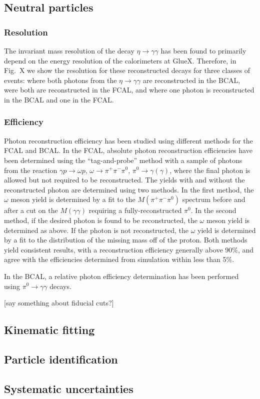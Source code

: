 \subsection{Neutral particles \label{sec:perfneutral}}

\subsubsection{Resolution \label{sec:perfneutralresol}}

The invariant mass resolution of the decay $\eta \to \gamma \gamma$ has been found to primarily depend on the energy resolution of the calorimeters at GlueX.  Therefore, in Fig.~X we show the resolution for these reconstructed decays for three classes of events: where both photons from the  $\eta \to \gamma \gamma$ are reconstructed in the BCAL, were both are reconstructed in the FCAL, and where one photon is reconstructed in the BCAL and one in the FCAL.

\subsubsection{Efficiency \label{sec:perfneutraleff}}

Photon reconstruction efficiency has been studied using different methods for the FCAL and BCAL.  In the FCAL, absolute photon reconstruction efficiencies have been determined using the ``tag-and-probe'' method with a sample of photons from the reaction $\gamma p \to \omega p$, $\omega \to \pi^+\pi^-\pi^0$, $\pi^0 \to \gamma (\gamma)$, where the final photon is allowed but not required to be reconstructed.  The yields with and without the reconstructed photon are determined using two methods.  In the first method, the $\omega$ meson yield is determined by a fit to the $M(\pi^+\pi^-\pi^0)$ spectrum before and after a cut on the $M(\gamma\gamma)$ requiring a fully-reconstructed $\pi^0$.  In the second method, if the desired photon is found to be reconstructed, the  $\omega$ meson yield is determined as above.  If the photon is not reconstructed, the $\omega$ yield is determined by a fit to the distribution of the missing mass off of the proton.
Both methods yield consistent results, with a reconstruction efficiency generally above 90\%, and agree with the efficiencies determined from simulation within less than 5\%.

In the BCAL, a relative photon efficiency determination has been performed using $\pi^0\to\gamma\gamma$ decays.  

[say something about fiducial cuts?]

\subsection{Kinematic fitting \label{sec:perffitting}}



\subsection{Particle identification \label{sec:perfpid}}

\subsection{Systematic uncertainties \label{sec:systematics}}
